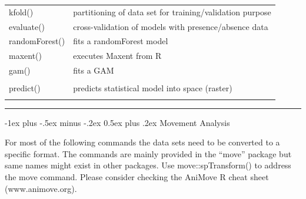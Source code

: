 \documentclass[10pt,landscape]{article}
\makeatletter
\renewcommand{\section}{\@startsection{section}{1}{0mm}%
                                {-1ex plus -.5ex minus -.2ex}%
                                {0.5ex plus .2ex}%
                                {\normalfont\large\bfseries}}
\makeatother
\begin{document}
\begin{multicols}{3}
\begin{tabular}{@{}p{\the\MyLen}%
                @{}p{\linewidth-\the\MyLen}@{}}
kfold() & partitioning of data set for training/validation purpose\\
evaluate() & cross-validation of models with presence/absence data\\               
randomForest() & fits a randomForest model  \\
maxent() & executes Maxent from R\\
gam() & fits a GAM \\
 &  \\                
predict() & predicts statistical model into space (raster) \\

 & 

\end{tabular}


\rule{0.32\textwidth}{0.4pt}
\scriptsize


\section{Movement Analysis}

For most of the following commands the data sets need to be converted to a specific format. The commands are mainly provided in the ``move'' package but same names might exist in other packages. Use move::spTransform() to address the move command. Please consider checking the AniMove R cheat sheet (www.animove.org).



\end{multicols}
\end{document}
